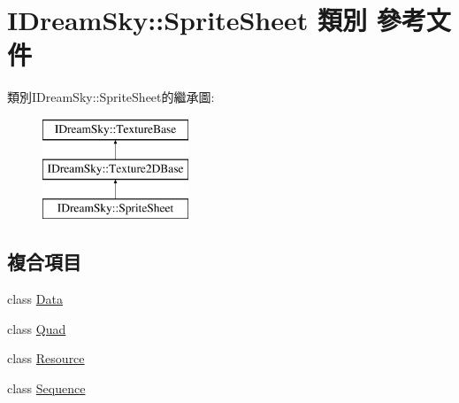 \hypertarget{class_i_dream_sky_1_1_sprite_sheet}{}\section{I\+Dream\+Sky\+:\+:Sprite\+Sheet 類別 參考文件}
\label{class_i_dream_sky_1_1_sprite_sheet}
類別\+I\+Dream\+Sky\+:\+:Sprite\+Sheet的繼承圖\+:\begin{figure}[H]
\begin{center}
\leavevmode
\includegraphics[height=3.000000cm]{class_i_dream_sky_1_1_sprite_sheet}
\end{center}
\end{figure}
\subsection*{複合項目}
\begin{DoxyCompactItemize}
\item 
class \hyperlink{class_i_dream_sky_1_1_sprite_sheet_1_1_data}{Data}
\item 
class \hyperlink{class_i_dream_sky_1_1_sprite_sheet_1_1_quad}{Quad}
\item 
class \hyperlink{class_i_dream_sky_1_1_sprite_sheet_1_1_resource}{Resource}
\item 
class \hyperlink{class_i_dream_sky_1_1_sprite_sheet_1_1_sequence}{Sequence}
\end{DoxyCompactItemize}
